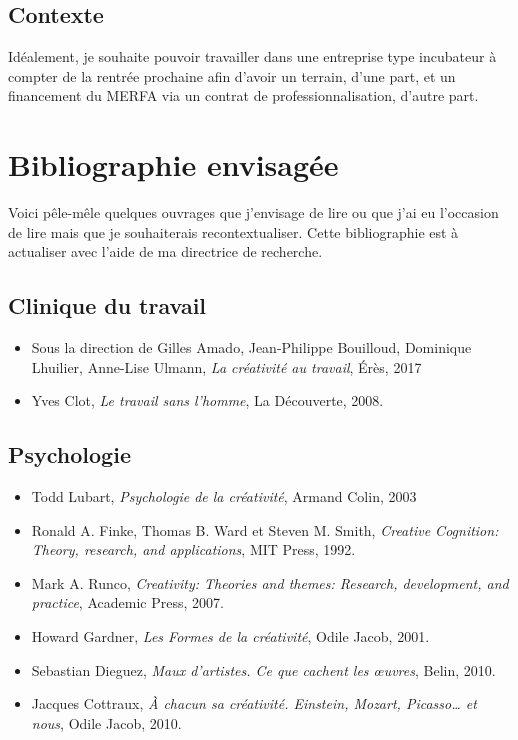 \documentclass{article}
\begin{document}
\subsection{Contexte}

Idéalement, je souhaite pouvoir travailler dans une entreprise type incubateur à compter de la rentrée prochaine afin d'avoir un terrain, d'une part, et un financement du MERFA via un contrat de professionnalisation, d'autre part. 

\section{Bibliographie envisagée}

Voici pêle-mêle quelques ouvrages que j'envisage de lire ou que j'ai eu l'occasion de lire mais que je souhaiterais recontextualiser. Cette bibliographie est à actualiser avec l'aide de ma directrice de recherche. 

\subsection{Clinique du travail}

\begin{itemize}

\item Sous la direction de Gilles Amado, Jean-Philippe Bouilloud, Dominique Lhuilier, Anne-Lise Ulmann, \textit{La créativité au travail}, Érès, 2017
\item Yves Clot, \textit{Le travail sans l’homme}, La Découverte, 2008.

\end{itemize}

\subsection{Psychologie}

\begin{itemize}

\item Todd Lubart, \textit{Psychologie de la créativité}, Armand Colin, 2003
\item Ronald A. Finke, Thomas B. Ward et Steven M. Smith, \textit{Creative Cognition: Theory, research, and applications}, MIT Press, 1992.
\item Mark A. Runco, \textit{Creativity: Theories and themes: Research, development, and practice}, Academic Press, 2007.
\item Howard Gardner, \textit{Les Formes de la créativité}, Odile Jacob, 2001.
\item Sebastian Dieguez, \textit{Maux d’artistes. Ce que cachent les œuvres}, Belin, 2010.
\item Jacques Cottraux, \textit{À chacun sa créativité. Einstein, Mozart, Picasso… et nous}, Odile Jacob, 2010.

\end{itemize}
\end{document}
